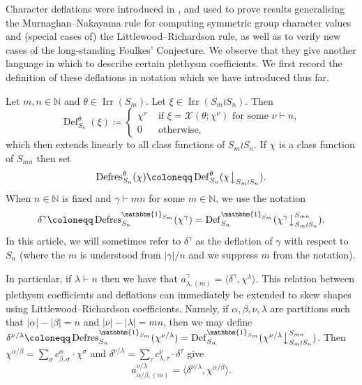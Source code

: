 \documentclass[ALCO, Unicode]{cedram}
\newcommand{\triv}{\mathbbm{1}}
\newcommand{\Irr}{\operatorname{Irr}}
\newcommand{\down}{\big\downarrow}
\newcommand{\cX}{\mathcal{X}}
\newcommand{\N}{\mathbb{N}}
\begin{document}
Character deflations were introduced in \cite[Definition 1.1]{EPW}, and used to prove results generalising the Murnaghan--Nakayama rule for computing symmetric group character values and (special cases of) the Littlewood--Richardson rule, as well as to verify new cases of the long-standing Foulkes' Conjecture. We observe that they give another language in which to describe certain plethysm coefficients. We first record the definition of these deflations in notation which we have introduced thus far.
\begin{definition}\label{def:deflation}
	Let $m,n\in\N$ and $\theta\in\Irr(S_m)$. Let $\xi\in\Irr(S_m\wr S_n)$. Then 
	\[ \operatorname{Def}^\theta_{S_n}(\xi) \coloneqq  \begin{cases}
		\chi^\nu & \text{ if }\xi = \cX(\theta;\chi^\nu)\text{ for some }\nu\vdash n,\\
		0 & \text{ otherwise},
	\end{cases} \]
	which then extends linearly to all class functions of $S_m\wr S_n$. If $\chi$ is a class function of $S_{mn}$ then set
	\[ \operatorname{Defres}^\theta_{S_n}(\chi) \coloneqq  \operatorname{Def}^\theta_{S_n}(\chi\down_{S_m\wr S_n}). \]
	When $n\in\N$ is fixed and $\gamma\vdash mn$ for some $m\in\N$, we use the notation
	\[ \delta^\gamma\coloneqq \operatorname{Defres}^{\triv_{S_m}}_{S_n}(\chi^\gamma) = \operatorname{Def}^{\triv_{S_m}}_{S_n}(\chi^\gamma\down^{S_{mn}}_{S_m\wr S_n}). \]
	In this article, we will sometimes refer to $\delta^\gamma$ as the deflation of $\gamma$ with respect to $S_n$ \textup{(}where the $m$ is understood from $|\gamma|/n$ and we suppress $m$ from the notation\textup{)}.
\end{definition}
In particular, if $\lambda\vdash n$ then we have that $a^\gamma_{\lambda,(m)} = \langle \delta^\gamma,\chi^\lambda \rangle$. This relation between plethysm coefficients and deflations can immediately be extended to skew shapes using Littlewood--Richardson coefficients. Namely, if $\alpha,\beta,\nu,\lambda$ are partitions such that $|\alpha|-|\beta|=n$ and $|\nu|-|\lambda|=mn$, then we may define $\delta^{\nu/\lambda}\coloneqq \operatorname{Defres}^{\triv_{S_m}}_{S_n}(\chi^{\nu/\lambda}) = \operatorname{Def}^{\triv_{S_m}}_{S_n}(\chi^{\nu/\lambda}\down^{S_{mn}}_{S_m\wr S_n})$. Then $\chi^{\alpha/\beta}=\sum_\sigma c^\alpha_{\beta,\sigma}\cdot \chi^\sigma$ and $\delta^{\nu/\lambda}=\sum_\tau c^\nu_{\lambda,\tau}\cdot \delta^\tau$ give
\begin{equation}\label{eqn:plethysm-deflation-skew}
	a^{\nu/\lambda}_{\alpha/\beta,(m)} = \langle \delta^{\nu/\lambda}, \chi^{\alpha/\beta}\rangle.
\end{equation}
\end{document}
